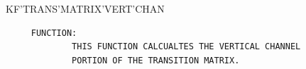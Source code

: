 \begin{frame}
KF'TRANS'MATRIX'VERT'CHAN
\begin{verbatim}
     FUNCTION:
             THIS FUNCTION CALCUALTES THE VERTICAL CHANNEL
             PORTION OF THE TRANSITION MATRIX.

\end{verbatim}
\end{frame}
